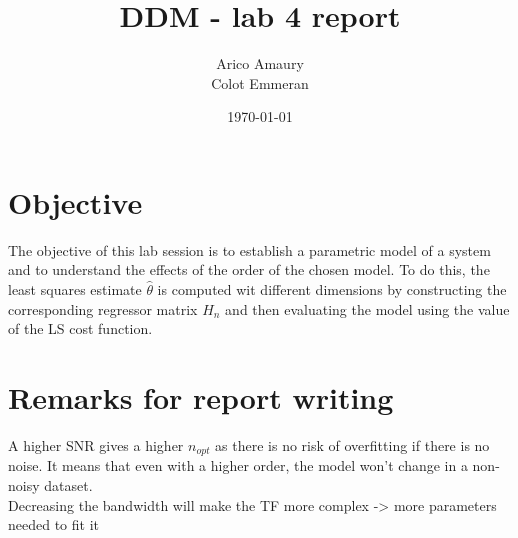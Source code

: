 \documentclass[10pt,twocolumn]{article}
\title{DDM - lab 4 report}
\author{Arico Amaury\\Colot Emmeran}
\date{\today}
\begin{document}
\maketitle

\section{Objective}
The objective of this lab session is to establish a parametric model of a system and to understand the effects of the order of the chosen model. To do this, the least squares estimate $\hat{\theta}$ is computed wit different dimensions by constructing the corresponding regressor matrix $H_n$ and then evaluating the model using the value of the LS cost function.

\section{Remarks for report writing}
A higher SNR gives a higher $n_{opt}$ as there is no risk of overfitting if there is no noise. It means that even with a higher order, the model won't change in a non-noisy dataset.\\
Decreasing the bandwidth will make the TF more complex -> more parameters needed to fit it
\end{document}
